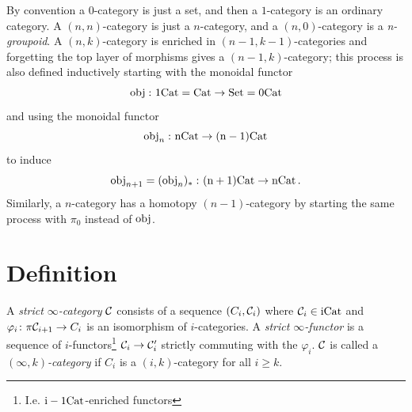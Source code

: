             By convention a $0$-category is just a set, and then a $1$-category is an ordinary category. A $(n,n)$-category is just a $n$-category, and a $(n,0)$-category is a \emph{n-groupoid}. A $(n,k)$-category is enriched in $(n-1,k-1)$-categories and forgetting the top layer of morphisms gives a $(n-1,k)$-category; this process is also defined inductively starting with the monoidal functor
            \begin{equation*}
                \operatorname{obj} \,\colon \mathrm{1Cat} = \operatorname{Cat} \to \operatorname{Set} = \mathrm{0Cat}
            \end{equation*}
            and using the monoidal functor
            \begin{equation*}
                \operatorname{obj}_n \,\colon \mathrm{nCat} \to \mathrm{(n - 1)Cat}  
            \end{equation*}
            to induce
            \begin{equation*}
                \operatorname{obj}_{n+1} = (\operatorname{obj}_{n})_{*} \,\colon \mathrm{(n+1)Cat} \to \mathrm{nCat} \,.
            \end{equation*}
            Similarly, a $n$-category has a homotopy $(n-1)$-category by starting the same process with $\pi_0$ instead of $\operatorname{obj}$.

    \section{Definition}
        A \emph{strict $\infty$-category} $\mathcal{C}$ consists of a sequence $(C_i, \mathcal{C}_i)$ where $\mathcal{C}_i \in \mathrm{iCat}$ and $\varphi_i \colon \pi \mathcal{C}_{i+1} \to C_i$ is an isomorphism of $i$-categories. A \emph{strict $\infty$-functor} is a sequence of $i$-functors\footnote{I.e. $\mathrm{i-1Cat}$-enriched functors} $\mathcal{C}_i \to \mathcal{C}'_i$ strictly commuting with the $\varphi_i$. $\mathcal{C}$ is called a \emph{$(\infty, k)$-category} if $C_i$ is a $(i, k)$-category for all $i \geq k$.
        \smallskip

